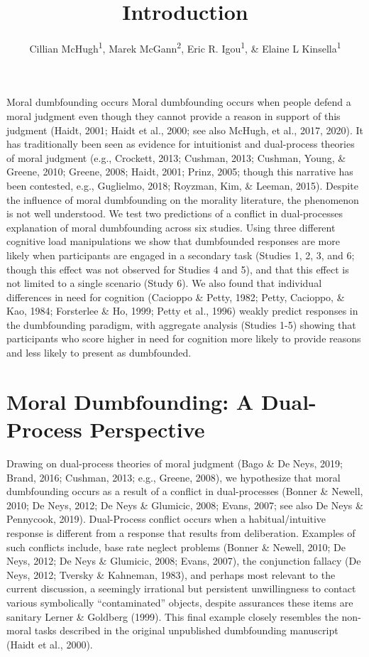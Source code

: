 \documentclass[
  american,
  man,floatsintext]{apa7}
\title{Introduction}
\author{Cillian McHugh\textsuperscript{1}, Marek McGann\textsuperscript{2}, Eric R. Igou\textsuperscript{1}, \& Elaine L Kinsella\textsuperscript{1}}
\date{}
\affiliation{\vspace{0.5cm}\textsuperscript{1} University of Limerick\\\textsuperscript{2} Mary Immaculate College \textasciitilde{} University of Limerick}
\begin{document}
\maketitle

{
\setcounter{tocdepth}{3}
\tableofcontents
}
Moral dumbfounding occurs Moral dumbfounding occurs when people defend a moral judgment even though they cannot provide a reason in support of this judgment (Haidt, 2001; Haidt et al., 2000; see also McHugh, et al., 2017, 2020). It has traditionally been seen as evidence for intuitionist and dual-process theories of moral judgment (e.g., Crockett, 2013; Cushman, 2013; Cushman, Young, \& Greene, 2010; Greene, 2008; Haidt, 2001; Prinz, 2005; though this narrative has been contested, e.g., Guglielmo, 2018; Royzman, Kim, \& Leeman, 2015). Despite the influence of moral dumbfounding on the morality literature, the phenomenon is not well understood. We test two predictions of a conflict in dual-processes explanation of moral dumbfounding across six studies. Using three different cognitive load manipulations we show that dumbfounded responses are more likely when participants are engaged in a secondary task (Studies 1, 2, 3, and 6; though this effect was not observed for Studies 4 and 5), and that this effect is not limited to a single scenario (Study 6). We also found that individual differences in need for cognition (Cacioppo \& Petty, 1982; Petty, Cacioppo, \& Kao, 1984; Forsterlee \& Ho, 1999; Petty et al., 1996) weakly predict responses in the dumbfounding paradigm, with aggregate analysis (Studies 1-5) showing that participants who score higher in need for cognition more likely to provide reasons and less likely to present as dumbfounded.

\hypertarget{moral-dumbfounding-a-dual-process-perspective}{%
\section{Moral Dumbfounding: A Dual-Process Perspective}\label{moral-dumbfounding-a-dual-process-perspective}}

Drawing on dual-process theories of moral judgment (Bago \& De Neys, 2019; Brand, 2016; Cushman, 2013; e.g., Greene, 2008), we hypothesize that moral dumbfounding occurs as a result of a conflict in dual-processes (Bonner \& Newell, 2010; De Neys, 2012; De Neys \& Glumicic, 2008; Evans, 2007; see also De Neys \& Pennycook, 2019). Dual-Process conflict occurs when a habitual/intuitive response is different from a response that results from deliberation. Examples of such conflicts include, base rate neglect problems (Bonner \& Newell, 2010; De Neys, 2012; De Neys \& Glumicic, 2008; Evans, 2007), the conjunction fallacy (De Neys, 2012; Tversky \& Kahneman, 1983), and perhaps most relevant to the current discussion, a seemingly irrational but persistent unwillingness to contact various symbolically ``contaminated'' objects, despite assurances these items are sanitary Lerner \& Goldberg (1999). This final example closely resembles the non-moral tasks described in the original unpublished dumbfounding manuscript (Haidt et al., 2000).
\end{document}
